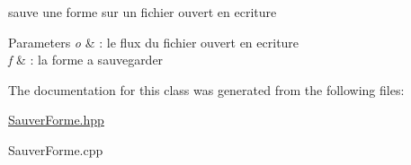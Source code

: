 sauve une forme sur un fichier ouvert en ecriture 


\begin{DoxyParams}{Parameters}
{\em o} & \+: le flux du fichier ouvert en ecriture \\
\hline
{\em f} & \+: la forme a sauvegarder \\
\hline
\end{DoxyParams}


The documentation for this class was generated from the following files\+:\begin{DoxyCompactItemize}
\item 
\mbox{\hyperlink{_sauver_forme_8hpp}{Sauver\+Forme.\+hpp}}\item 
Sauver\+Forme.\+cpp\end{DoxyCompactItemize}
